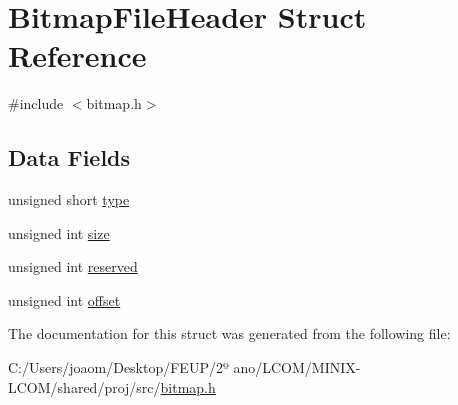 \hypertarget{struct_bitmap_file_header}{}\section{Bitmap\+File\+Header Struct Reference}
\label{struct_bitmap_file_header}


{\ttfamily \#include $<$bitmap.\+h$>$}

\subsection*{Data Fields}
\begin{DoxyCompactItemize}
\item 
unsigned short \mbox{\hyperlink{group__bitmap_gaa929142c5ddf34cf0915c97a617a1a63}{type}}
\item 
unsigned int \mbox{\hyperlink{group__bitmap_gaac913b3a1f6ef005d66bf7a84428773e}{size}}
\item 
unsigned int \mbox{\hyperlink{group__bitmap_ga05d5cbcb44f437341bd9fa37d589aced}{reserved}}
\item 
unsigned int \mbox{\hyperlink{group__bitmap_ga29b5297d3393519050e3126c4cb07c1c}{offset}}
\end{DoxyCompactItemize}


The documentation for this struct was generated from the following file\+:\begin{DoxyCompactItemize}
\item 
C\+:/\+Users/joaom/\+Desktop/\+F\+E\+U\+P/2º ano/\+L\+C\+O\+M/\+M\+I\+N\+I\+X-\/\+L\+C\+O\+M/shared/proj/src/\mbox{\hyperlink{bitmap_8h}{bitmap.\+h}}\end{DoxyCompactItemize}
